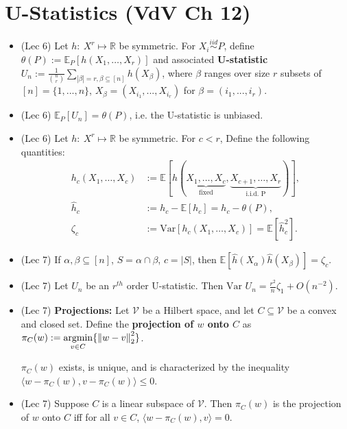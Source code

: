 \documentclass[twoside]{article}
\newcommand{\dis}{\displaystyle}
\newcommand{\norm}[1]{\left\|{#1}\right\|} %
\newcommand{\ltwo}[1]{\norm{#1}_2} %
\newcommand\bbE{\mathbb{E}}
\newcommand\bbR{\mathbb{R}}
\def\t{\theta}
\providecommand{\argmin}{\mathop{\rm argmin}}
\newcommand\var{\text{Var }}
\begin{document}
\section{U-Statistics (VdV Ch 12)}
\begin{itemize}
\item (Lec 6) Let $h:\ X^r \mapsto \bbR$ be symmetric. For
$X_i \stackrel{iid}{\sim} P$, define $\theta(P):= \bbE_P\left[h\left(X_1,\dots,X_r\right)\right]$
and associated \textbf{U-statistic} $U_n := \dis\frac{1}{\binom{n}{r}} \sum_{|\beta|=r,\beta\subseteq [n]} h(X_\beta)$, where $\beta$ ranges over size $r$ subsets of $[n]= \{ 1,...,n\}$, $X_\beta = \left(X_{i_1},...,X_{i_r}\right)$ for $\beta=(i_1,...,i_r)$.

\item (Lec 6) $\bbE_P [U_n] = \t(P)$, i.e. the U-statistic is unbiased.

\item (Lec 6) Let $h:\ X^r \mapsto \bbR$ be symmetric. For $c < r$, Define the following quantities:
\begin{align*}
h_c(X_1,\dots,X_c) &:= \bbE \left[h \left(\underset{\text{fixed}}{\underbrace{X_1,\dots,X_c}}, \underset{\text{i.i.d. P}}{\underbrace{X_{c+1},\dots,X_r}}\right)\right], \\ 
\hat{h}_c &:= h_c - \bbE[h_c] = h_c - \t(P), \\ 
\zeta_c &:= \text{Var}[h_c(X_1, \dots, X_c)] = \bbE \left[ \hat{h}_c^2 \right].
\end{align*}

\item (Lec 7) If $\alpha, \beta \subseteq [n]$, $S = \alpha \cap \beta$, $c = |S|$, then $\bbE \left[ \hat{h}(X_\alpha) \hat{h}(X_\beta) \right] = \zeta_c$.

\item (Lec 7) Let $U_n$ be an $r^{th}$ order U-statistic. Then $\var U_n = \dis\frac{r^2}{n}\zeta_1 + O(n^{-2})$.

\item (Lec 7) \textbf{Projections:} Let $\mathcal{V}$ be a Hilbert space, and let $C \subseteq \mathcal{V}$ be a convex and closed set. Define the \textbf{projection of $w$ onto $C$} as $\pi_C(w) := \dis\argmin_{v \in C} \{ \ltwo{w-v}^2 \}$. 

$\pi_C(w)$ exists, is unique, and is characterized by the inequality $\langle w - \pi_C(w), v - \pi_C(w) \rangle \leq 0$.

\item (Lec 7) Suppose $C$ is a linear subspace of $\mathcal{V}$. Then $\pi_C(w)$ is the projection of $w$ onto $C$ iff for all $v \in C$, $\langle w - \pi_C(w), v \rangle = 0$.


\end{itemize}
\end{document}
